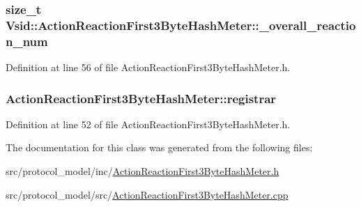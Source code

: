\hypertarget{class_vsid_1_1_action_reaction_first3_byte_hash_meter_a396a0b8f344ca80365ddbca7d4e07889}{
\subsubsection[{\-\_\-overall\-\_\-reaction\-\_\-num}]{\setlength{\rightskip}{0pt plus 5cm}size\-\_\-t Vsid\-::\-Action\-Reaction\-First3\-Byte\-Hash\-Meter\-::\-\_\-overall\-\_\-reaction\-\_\-num\hspace{0.3cm}{\ttfamily [protected]}}}\label{class_vsid_1_1_action_reaction_first3_byte_hash_meter_a396a0b8f344ca80365ddbca7d4e07889}


Definition at line 56 of file Action\-Reaction\-First3\-Byte\-Hash\-Meter.\-h.

\hypertarget{class_vsid_1_1_action_reaction_first3_byte_hash_meter_adc746ce9d3f4f22d35331bc687a88483}{
\subsubsection[{registrar}]{ Action\-Reaction\-First3\-Byte\-Hash\-Meter\-::registrar\hspace{0.3cm}{\ttfamily [static]}}}\label{class_vsid_1_1_action_reaction_first3_byte_hash_meter_adc746ce9d3f4f22d35331bc687a88483}


Definition at line 52 of file Action\-Reaction\-First3\-Byte\-Hash\-Meter.\-h.



The documentation for this class was generated from the following files\-:\begin{DoxyCompactItemize}
\item 
src/protocol\-\_\-model/inc/\hyperlink{_action_reaction_first3_byte_hash_meter_8h}{Action\-Reaction\-First3\-Byte\-Hash\-Meter.\-h}\item 
src/protocol\-\_\-model/src/\hyperlink{_action_reaction_first3_byte_hash_meter_8cpp}{Action\-Reaction\-First3\-Byte\-Hash\-Meter.\-cpp}\end{DoxyCompactItemize}

